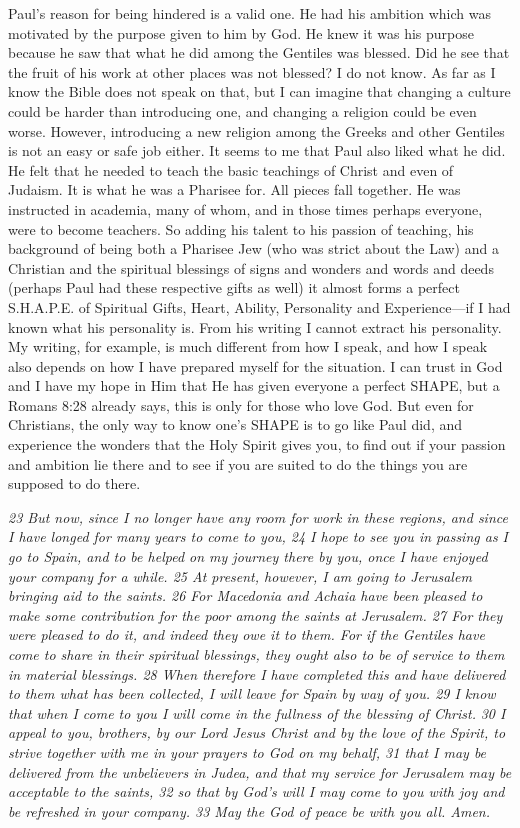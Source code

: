 Paul's reason for being hindered is a valid one. He had his ambition
which was motivated by the purpose given to him by God. He knew it was
his purpose because he saw that what he did among the Gentiles was
blessed. Did he see that the fruit of his work at other places was not
blessed? I do not know. As far as I know the Bible does not speak on
that, but I can imagine that changing a culture could be harder than
introducing one, and changing a religion could be even worse. However,
introducing a new religion among the Greeks and other Gentiles is not an
easy or safe job either. It seems to me that Paul also liked what he
did. He felt that he needed to teach the basic teachings of Christ and
even of Judaism. It is what he was a Pharisee for. All pieces fall
together. He was instructed in academia, many of whom, and in those
times perhaps everyone, were to become teachers. So adding his talent to
his passion of teaching, his background of being both a Pharisee Jew
(who was strict about the Law) and a Christian and the spiritual
blessings of signs and wonders and words and deeds (perhaps Paul had
these respective gifts as well) it almost forms a perfect S.H.A.P.E. of
Spiritual Gifts, Heart, Ability, Personality and Experience---if I had
known what his personality is. From his writing I cannot extract his
personality. My writing, for example, is much different from how I
speak, and how I speak also depends on how I have prepared myself for
the situation. I can trust in God and I have my hope in Him that He has
given everyone a perfect SHAPE, but a Romans 8:28 already says, this is
only for those who love God. But even for Christians, the only way to
know one's SHAPE is to go like Paul did, and experience the wonders that
the Holy Spirit gives you, to find out if your passion and ambition lie
there and to see if you are suited to do the things you are supposed to
do there.

\emph{23 But now, since I no longer have any room for work in these
regions, and since I have longed for many years to come to you, 24 I
hope to see you in passing as I go to Spain, and to be helped on my
journey there by you, once I have enjoyed your company for a while. 25
At present, however, I am going to Jerusalem bringing aid to the saints.
26 For Macedonia and Achaia have been pleased to make some contribution
for the poor among the saints at Jerusalem. 27 For they were pleased to
do it, and indeed they owe it to them. For if the Gentiles have come to
share in their spiritual blessings, they ought also to be of service to
them in material blessings. 28 When therefore I have completed this and
have delivered to them what has been collected, I will leave for Spain
by way of you. 29 I know that when I come to you I will come in the
fullness of the blessing of Christ.} \emph{30 I appeal to you, brothers,
by our Lord Jesus Christ and by the love of the Spirit, to strive
together with me in your prayers to God on my behalf, 31 that I may be
delivered from the unbelievers in Judea, and that my service for
Jerusalem may be acceptable to the saints, 32 so that by God's will I
may come to you with joy and be refreshed in your company. 33 May the
God of peace be with you all. Amen.}

